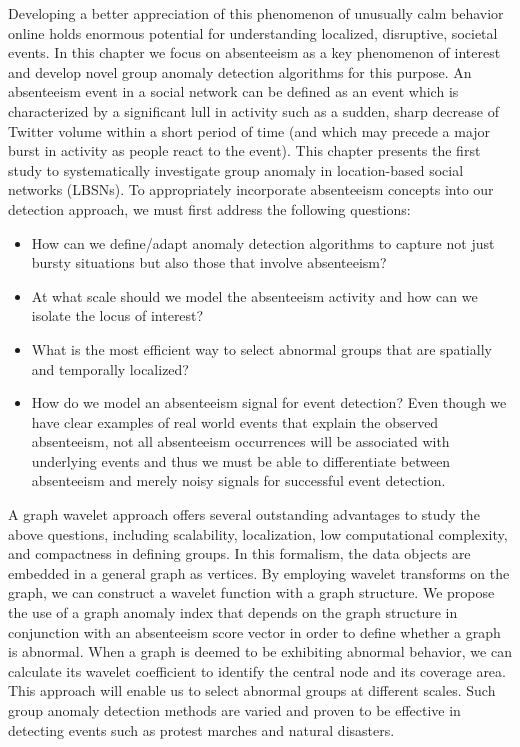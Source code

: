 Developing a better appreciation of this phenomenon of unusually calm behavior online holds enormous potential for understanding localized, disruptive, societal events. In this chapter we focus on
absenteeism as a key phenomenon of interest and develop novel
group anomaly detection algorithms for this purpose.
An absenteeism event in a social network can be defined as an event which is characterized by a significant lull in activity such as a sudden, sharp decrease of Twitter volume within a short period of time (and which may precede a major burst in activity as people react to the event). This chapter presents the first study to systematically investigate group anomaly in location-based social networks (LBSNs). To appropriately incorporate absenteeism concepts into our detection approach, we must first address the following questions:

\begin{itemize}
\item How can we define/adapt anomaly detection algorithms to capture not just bursty situations
but also those that involve absenteeism?
\item At what scale should we model the absenteeism activity and how can we isolate the locus of
interest?
\item What is the most efficient way to select abnormal groups that are spatially and temporally localized?
\item How do we model an absenteeism signal for event detection? Even though we have clear examples of real world events that explain the observed absenteeism, not all absenteeism occurrences will be associated with underlying events and thus we must be able to differentiate between absenteeism and merely
noisy signals for successful event detection.
\end{itemize}

A graph wavelet approach offers several outstanding advantages to study the above questions, including scalability, localization, low computational complexity, and
compactness in defining groups. In this formalism, the data objects are embedded in a general graph as vertices. By employing wavelet transforms on the graph, we can construct a wavelet function with a graph structure. We propose the use of a graph anomaly index that depends on the graph structure in conjunction with an absenteeism score vector in order to define whether a graph is abnormal. When a graph is deemed to be exhibiting abnormal behavior, we can calculate its wavelet coefficient to identify the central node and its coverage area. This approach will enable us to select abnormal groups at different scales. Such group anomaly detection methods are varied and proven to be effective in detecting events such as protest marches and natural disasters.


